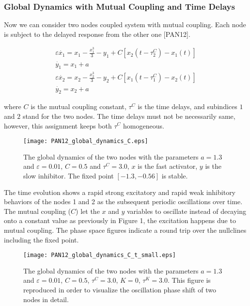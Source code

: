 \documentclass[12pt]{article}
\begin{document}
\newpage

\subsubsection{Global Dynamics with Mutual Coupling and Time Delays}

Now we can consider two nodes coupled system with mutual coupling. Each node is subject to the delayed response from the other one [PAN12]. 

\begin{subequations} \begin{align} \varepsilon  \dot{x_1} = x_1 - \frac{x_1^3}{3} -y_1  + C [x_2(t-\tau_2^C)-x_1(t)] \label{eqn: frobenius 10}\\  \dot{y_1} = x_1+a \label{eqn: frobenius 11}  \\ \varepsilon  \dot{x_2} = x_2 - \frac{x_2^3}{3} -y_2  + C [x_1(t-\tau_1^C)-x_2(t)] \label{eqn: frobenius 12}  \\  \dot{y_2} = x_2+a \label{eqn: frobenius 13} 
\end{align} 
\end{subequations}

where $C$ is the mutual coupling constant, $\tau^C$ is the time delays, and subindices $1$ and $2$ stand for the two nodes. The time delays must not be necessarily same, however, this assignment keeps both $\tau^C$ homogeneous.

\begin{figure}[h!]
	\centering
	\texttt{[image: PAN12\_global\_dynamics\_C.eps]}
		\caption{The global dynamics of the two nodes with the parameters $a=1.3$ and $\varepsilon = 0.01$, $C=0.5$ and $\tau^C= 3.0$, $x$ is the fast activator, $y$ is the slow inhibitor. The fixed point $[-1.3 , -0.56]$ is stable.}
\end{figure}

\newpage 
 The time evolution shows a rapid strong excitatory and rapid weak inhibitory behaviors of the nodes 1 and 2 as the subsequent periodic oscillations over time. The mutual coupling ($C$) let the $x$ and $y$ variables to oscillate instead of decaying onto a constant value as previously in Figure 1, the excitation happens due to mutual coupling. The phase space figures indicate a round trip over the nullclines including the fixed point.
 
\begin{figure}[h!]
	\centering
	\texttt{[image: PAN12\_global\_dynamics\_C\_t\_small.eps]}
		\caption{The global dynamics of the two nodes with the parameters $a=1.3$ and $\varepsilon = 0.01$, $C=0.5$, $\tau^C= 3.0$, $K=0$, $\tau^K= 3.0$. This figure is reproduced in order to visualize the oscillation phase shift of two nodes in detail.}
\end{figure} 
 
\end{document}
